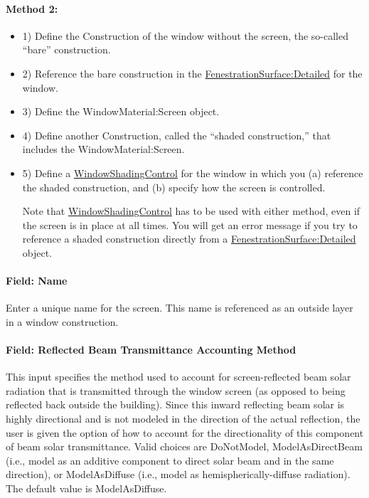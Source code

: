 \paragraph{Method 2:}\label{method-2-2}

\begin{itemize}
\item 1) Define the Construction of the window without the screen, the so-called ``bare'' construction.

\item 2) Reference the bare construction in the \hyperref[fenestrationsurfacedetailed]{FenestrationSurface:Detailed} for the window.

\item 3) Define the WindowMaterial:Screen object.

\item 4) Define another Construction, called the ``shaded construction,'' that includes the WindowMaterial:Screen.

\item 5) Define a \hyperref[windowpropertyshadingcontrol]{WindowShadingControl} for the window in which you (a) reference the shaded construction, and (b) specify how the screen is controlled.

Note that \hyperref[windowpropertyshadingcontrol]{WindowShadingControl} has to be used with either method, even if the screen is in place at all times. You will get an error message if you try to reference a shaded construction directly from a \hyperref[fenestrationsurfacedetailed]{FenestrationSurface:Detailed} object.

\end{itemize}

\paragraph{Field: Name}\label{field-name-19-004}

Enter a unique name for the screen. This name is referenced as an outside layer in a window construction.

\paragraph{Field: Reflected Beam Transmittance Accounting Method}\label{field-reflected-beam-transmittance-accounting-method}

This input specifies the method used to account for screen-reflected beam solar radiation that is transmitted through the window screen (as opposed to being reflected back outside the building). Since this inward reflecting beam solar is highly directional and is not modeled in the direction of the actual reflection, the user is given the option of how to account for the directionality of this component of beam solar transmittance. Valid choices are DoNotModel, ModelAsDirectBeam (i.e., model as an additive component to direct solar beam and in the same direction), or ModelAsDiffuse (i.e., model as hemispherically-diffuse radiation). The default value is ModelAsDiffuse.

